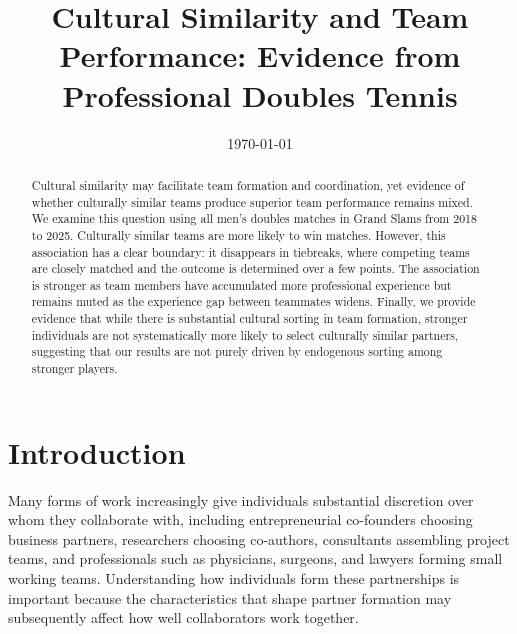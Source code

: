 \documentclass[10pt]{article}
\title{Cultural Similarity and Team Performance: Evidence from Professional Doubles Tennis}
\author{}
\date{\today}
\begin{document}
\maketitle
\thispagestyle{empty}

\begin{abstract}

Cultural similarity may facilitate team formation and coordination, yet evidence of whether culturally similar teams produce superior team performance remains mixed. We examine this question using all men’s doubles matches in Grand Slams from 2018 to 2025.  Culturally similar teams are more likely to win matches. However, this association has a clear boundary: it disappears in tiebreaks, where competing teams are closely matched and the outcome is determined over a few points. The association is stronger as team members have accumulated more professional experience but remains muted as the experience gap between teammates widens. Finally, we provide evidence that while there is substantial cultural sorting in team formation, stronger individuals are not systematically more likely to select culturally similar partners, suggesting that our results are not purely driven by endogenous sorting among stronger players.

\end{abstract}
\newpage
\section{Introduction}
Many forms of work increasingly give individuals substantial discretion over whom they collaborate with, including entrepreneurial co-founders choosing business partners, researchers choosing co-authors, consultants assembling project teams, and professionals such as physicians, surgeons, and lawyers forming small working teams. %
Understanding how individuals form these partnerships is important because the characteristics that shape partner formation may subsequently affect how well collaborators work together.
\end{document}
